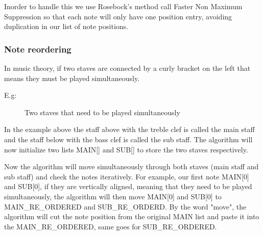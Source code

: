 \documentclass[final]{cvpr}
\begin{document}
Inorder to handle this we use Rosebock's method \cite{Rosebrock} call Faster Non
Maximum Suppression so that each note will only have one position entry, avoiding
duplication in our list of note positions.

\subsubsection{Note reordering} 



In music theory, if two staves are connected by a curly bracket on the left
that means they must be played simultaneously.

E.g: 
\begin{figure}[h]
\caption{Two staves that need to be played simultaneously}
\label{fig:two staves}
\end{figure}


In the example above the staff above with the treble clef is called the main
staff and the staff below with the bass clef is called the sub staff. The
algorithm will now initialize two lists MAIN[] and SUB[] to store the two staves
respectively.

Now the algorithm will move simultaneously through both staves (main staff and sub staff) and check the
notes iteratively. For example, our first note MAIN[0] and SUB[0], if they
are vertically aligned, meaning that they need to be played simultaneously,
the algorithm will then move MAIN[0] and SUB[0] to MAIN\_RE\_ORDERED and
SUB\_RE\_ORDERD. By the word "move", the algorithm will cut the note
position from the original MAIN list and paste it into the
MAIN\_RE\_ORDERED, same goes for SUB\_RE\_ORDERED.\\
\end{document}

